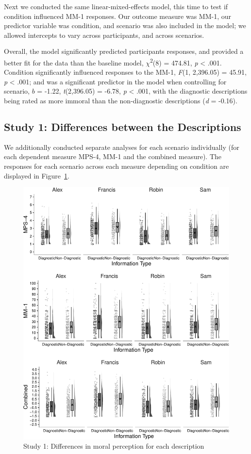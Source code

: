 \documentclass[
  man,floatsintext]{apa6}
\begin{document}
Next we conducted the same linear-mixed-effects model, this time to test if condition influenced MM-1 responses. Our outcome measure was MM-1, our predictor variable was condition, and scenario was also included in the model; we allowed intercepts to vary across participants, and across scenarios.

Overall, the model significantly predicted participants responses, and provided a better fit for the data than the baseline model, \(\chi\)\textsuperscript{2}(8) = 474.81, \emph{p} \textless{} .001. Condition significantly influenced responses to the MM-1, \emph{F}(1, 2,396.05) = 45.91, \emph{p} \textless{} .001; and was a significant predictor in the model when controlling for scenario, \(b\) = -1.22, \emph{t}(2,396.05) = -6.78, \emph{p} \textless{} .001, with the diagnostic descriptions being rated as more immoral than the non-diagnostic descriptions (\emph{d} = -0.16).

\subsection{Study 1: Differences between the Descriptions}\label{study-1-differences-between-the-descriptions}

We additionally conducted separate analyses for each scenario individually (for each dependent measure MPS-4, MM-1 and the combined measure). The responses for each scenario across each measure depending on condition are displayed in Figure~\ref{fig:S1allscenariosPlot}.

\begin{figure}[!h]
\includegraphics[width=\textwidth,]{Supplementary_files/figure-latex/S1allscenariosPlot-1} \caption{Study 1: Differences in moral perception for each description}\label{fig:S1allscenariosPlot}
\end{figure}
\end{document}
